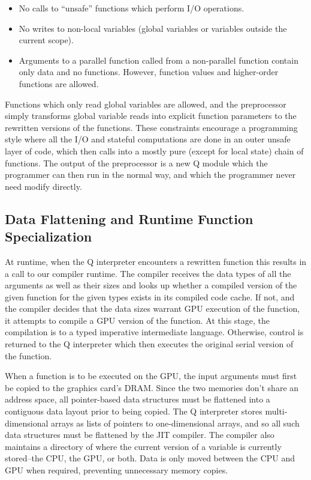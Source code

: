 \documentclass[preprint]{sigplanconf}
\begin{document}
\begin{itemize}
\item No calls to ``unsafe'' functions which perform I/O operations.
\item No writes to non-local variables (global variables or variables outside the current scope).
\item Arguments to a parallel function called from a non-parallel function contain only data and no functions.  However, function values and higher-order functions are allowed.
\end{itemize}

Functions which only read global variables are allowed, and the preprocessor simply transforms global variable reads into explicit function parameters to the rewritten versions of the functions.  These constraints encourage a programming style where all the I/O and stateful computations are done in an outer unsafe layer of code, which then calls into a mostly pure (except for local state) chain of functions.  The output of the preprocessor is a new Q module which the programmer can then run in the normal way, and which the programmer never need modify directly.

\subsection{Data Flattening and Runtime Function Specialization}
At runtime, when the Q interpreter encounters a rewritten function this results in a call to our compiler runtime.  The compiler receives the data types of all the arguments as well as their sizes and looks up whether a compiled version of the given function for the given types exists in its compiled code cache.  If not, and the compiler decides that the data sizes warrant GPU execution of the function, it attempts to compile a GPU version of the function.  At this stage, the compilation is to a typed imperative intermediate language.  Otherwise, control is returned to the Q interpreter which then executes the original serial version of the function.

When a function is to be executed on the GPU, the input arguments must first be copied to the graphics card's DRAM.  Since the two memories don't share an address space, all pointer-based data structures must be flattened into a contiguous data layout prior to being copied.  The Q interpreter stores multi-dimensional arrays as lists of pointers to one-dimensional arrays, and so all such data structures must be flattened by the JIT compiler.  The compiler also maintains a directory of where the current version of a variable is currently stored--the CPU, the GPU, or both.  Data is only moved between the CPU and GPU when required, preventing unnecessary memory copies.
\end{document}
